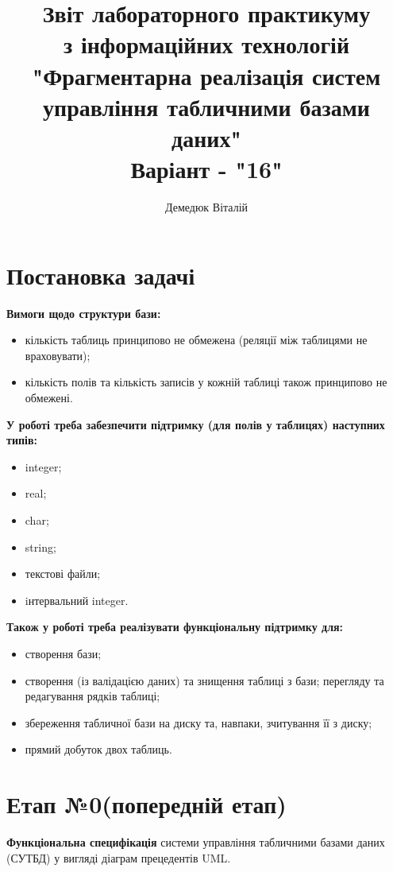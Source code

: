 \documentclass[a4paper, 12pt]{article}
\author{Демедюк Віталій}
\title{Звіт лабораторного практикуму\\
       з інформаційних технологій\\
       "Фрагментарна реалізація систем управління табличними базами даних"\\
       Варіант - "16"}
\begin{document}
\maketitle

\newpage

\tableofcontents

\newpage

\section{Постановка задачі}

\textbf{Вимоги щодо структури бази:}

\begin{itemize}
\item кількість таблиць принципово не обмежена (реляції між таблицями не враховувати);
\item кількість полів та кількість записів у кожній таблиці також принципово не обмежені.
\end{itemize}


\textbf{У роботі треба забезпечити підтримку (для полів у таблицях) наступних типів:}

\begin{itemize}
\item integer;
\item real;
\item char;
\item string;
\item текстові файли;
\item iнтервальний integer.
\end{itemize}

\textbf{Також у роботі треба реалізувати функціональну підтримку для:}

\begin{itemize}
\item створення бази;
\item створення (із валідацією даних) та знищення таблиці з бази;
перегляду та редагування рядків таблиці;
\item збереження табличної бази на диску та, навпаки, зчитування її з диску;
\item прямий добуток двох таблиць.
\end{itemize}

\section{Етап №0(попередній етап)}

\textbf{Функціональна специфікація} системи управління табличними базами даних (СУТБД) у вигляді діаграм прецедентів UML.
\end{document}
